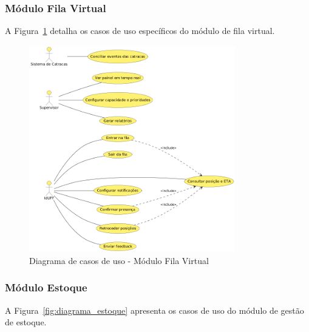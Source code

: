 \documentclass[12pt,a4paper]{article}
\begin{document}
\subsubsection{Módulo Fila Virtual}
A Figura~\ref{fig:diagrama_fila} detalha os casos de uso específicos do módulo de fila virtual.

\begin{figure}[htbp]
    \centering
    \includegraphics[width=0.8\textwidth]{diagramas/diagrama-fila.png}
    \caption{Diagrama de casos de uso - Módulo Fila Virtual}
    \label{fig:diagrama_fila}
\end{figure}

\subsubsection{Módulo Estoque}
A Figura~\ref{fig:diagrama_estoque} apresenta os casos de uso do módulo de gestão de estoque.
\end{document}
